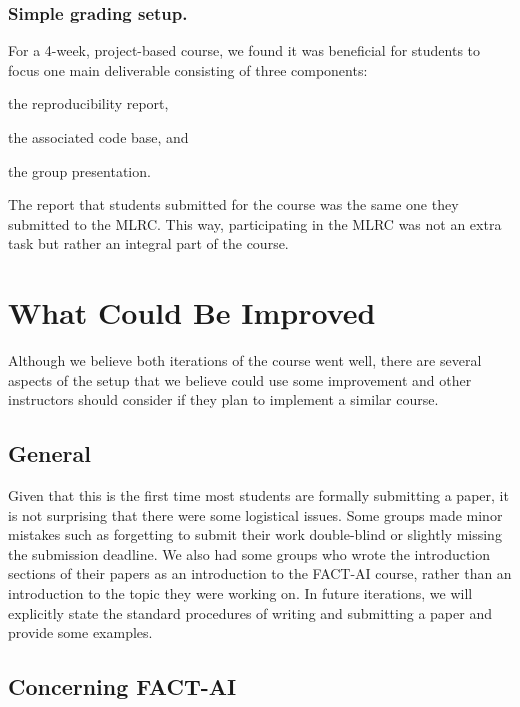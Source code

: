 \documentclass[letterpaper]{article}
\begin{document}
\subsubsection{Simple grading setup.}
For a 4-week, project-based course, we found it was beneficial for students to focus one main deliverable consisting of three components: 
\begin{enumerate*}[label=(\roman*)]
\item the reproducibility report, 
\item the associated code base, and
\item the group presentation. 
\end{enumerate*}
The report that students submitted for the course was the same one they submitted to the MLRC. This way, participating in the MLRC was not an extra task but rather an integral part of the course. 


\section{What Could Be Improved}
\label{section:whatdidnt}


Although we believe both iterations of the course went well, there are several aspects of the setup that we believe could use some improvement and other instructors should consider if they plan to implement a similar course. 

\subsection{General}

Given that this is the first time most students are formally submitting a paper, it is not surprising that there were some logistical issues. 
Some groups made minor mistakes such as forgetting to submit their work double-blind or slightly missing the submission deadline. 
We also had some groups who wrote the introduction sections of their papers as an introduction to the FACT-AI course, rather than an introduction to the topic they were working on. 
In future iterations, we will explicitly state the standard procedures of writing and submitting a paper and provide some examples. 

\subsection{Concerning FACT-AI}
\label{section:non-technical}
\end{document}
